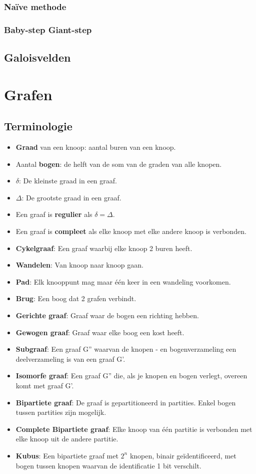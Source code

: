 \documentclass[12pt]{report}
\newcommand{\important}[1] {\textbf{\color{orange}#1}}
\begin{document}
\subsection{Naïve methode}

\subsection{Baby-step Giant-step}

\section{Galoisvelden}
\chapter{Grafen}
\section{Terminologie}
\begin{itemize}
 \item \important{Graad} van een knoop: aantal buren van een knoop.
 \item Aantal \important{bogen}: de helft van de som van de graden van alle knopen.
 \item $\delta$: De kleinste graad in een graaf.
 \item $\Delta$: De grootste graad in een graaf.
 \item Een graaf is \important{regulier} als $\delta = \Delta$.
 \item Een graaf is \important{compleet} als elke knoop met elke andere knoop is verbonden.
 \item \important{Cykelgraaf}: Een graaf waarbij elke knoop 2 buren heeft.
 \item \important{Wandelen}: Van knoop naar knoop gaan.
 \item \important{Pad}: Elk knooppunt mag maar één keer in een wandeling voorkomen.
 \item \important{Brug}: Een boog dat 2 grafen verbindt.
 \item \important{Gerichte graaf}: Graaf waar de bogen een richting hebben.
 \item \important{Gewogen graaf}: Graaf waar elke boog een kost heeft.
 \item \important{Subgraaf}: Een graaf G'' waarvan de knopen - en bogenverzameling een deelverzameling is van een graaf G'.
 \item \important{Isomorfe graaf}: Een graaf G'' die, als je knopen en bogen verlegt, overeen komt met graaf G'.
 \item \important{Bipartiete graaf}: De graaf is gepartitioneerd in partities. Enkel bogen tussen partities zijn mogelijk.
 \item \important{Complete Bipartiete graaf}: Elke knoop van één partitie is verbonden met elke knoop uit de andere partitie.
 \item \important{Kubus}: Een bipartiete graaf met $2^n$ knopen, binair geïdentificeerd, met bogen tussen knopen waarvan de identificatie 1 bit verschilt. 
\end{itemize}
\end{document}
